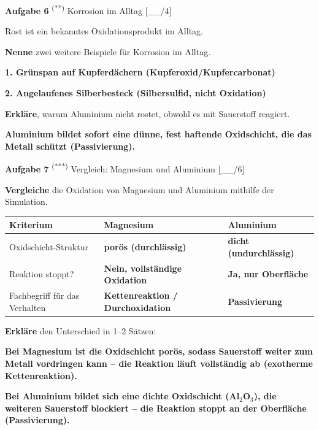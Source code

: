 \documentclass[11pt, a4paper]{article}
\newif\ifzeigesternchen\zeigesternchentrue
\newcommand{\lsg}[1]{\textcolor{loesung}{\textbf{#1}}}  %
\newcommand{\punktebox}[1]{\hfill\small\textcolor{mittelgrau}{[\_\_/#1]}}
\newcommand{\stern}[1]{%
    \ifzeigesternchen%
        \textsuperscript{\textcolor{fachfarbe}{(#1)}}%
    \fi%
}
\newcommand{\aufgabe}[2]{%
    \needspace{4\baselineskip}%
    \vspace{10pt}%
    \noindent\textbf{\textcolor{fachfarbe}{Aufgabe #1}} #2%
    \vspace{4pt}%
    \nopagebreak[4]%
}
\newcommand{\operator}[1]{\textbf{\textcolor{fachfarbe}{#1}}}
\begin{document}

\aufgabe{6}{\stern{**} Korrosion im Alltag} \punktebox{4}

Rost ist ein bekanntes Oxidationsprodukt im Alltag.

\begin{teil}
    \item \operator{Nenne} zwei weitere Beispiele für Korrosion im Alltag.

    \lsg{1. Grünspan auf Kupferdächern (Kupferoxid/Kupfercarbonat)}

    \lsg{2. Angelaufenes Silberbesteck (Silbersulfid, nicht Oxidation)}

    \item \operator{Erkläre}, warum Aluminium nicht rostet, obwohl es mit Sauerstoff reagiert.

    \lsg{Aluminium bildet sofort eine dünne, fest haftende Oxidschicht, die das Metall schützt (Passivierung).}
\end{teil}


\aufgabe{7}{\stern{***} Vergleich: Magnesium und Aluminium} \punktebox{6}

\operator{Vergleiche} die Oxidation von Magnesium und Aluminium mithilfe der Simulation.

\begin{center}
\begin{tabular}{|p{4.5cm}|p{4.5cm}|p{4.5cm}|}
\hline
\textbf{Kriterium} & \textbf{Magnesium} & \textbf{Aluminium} \\
\hline
Oxidschicht-Struktur & \lsg{porös (durchlässig)} & \lsg{dicht (undurchlässig)} \\[0.5em]
\hline
Reaktion stoppt? & \lsg{Nein, vollständige Oxidation} & \lsg{Ja, nur Oberfläche} \\[0.5em]
\hline
Fachbegriff für das Verhalten & \lsg{Kettenreaktion / Durchoxidation} & \lsg{Passivierung} \\[0.5em]
\hline
\end{tabular}
\end{center}

\operator{Erkläre} den Unterschied in 1--2 Sätzen:

\lsg{Bei Magnesium ist die Oxidschicht porös, sodass Sauerstoff weiter zum Metall vordringen kann – die Reaktion läuft vollständig ab (exotherme Kettenreaktion).}

\lsg{Bei Aluminium bildet sich eine dichte Oxidschicht (Al$_2$O$_3$), die weiteren Sauerstoff blockiert – die Reaktion stoppt an der Oberfläche (Passivierung).}
\end{document}

